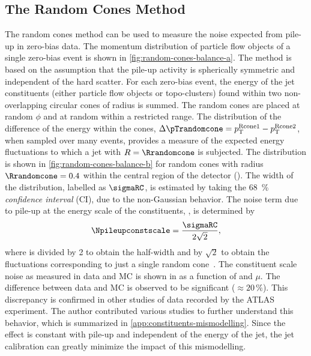 

\subsection{The Random Cones Method}
\label{subsec:random-cones-method}

The random cones method can be used to measure the noise expected from pile-up in zero-bias data. The momentum distribution of particle flow objects of a single zero-bias event is shown in \cref{fig:random-cones-balance-a}.
The method is based on the assumption that the pile-up activity is spherically symmetric and independent of the hard scatter.
For each zero-bias event, the energy of the jet constituents (either particle flow objects or topo-clusters) found within two non-overlapping circular cones of radius \Rrandomcone is summed.
The random cones are placed at random $\phi$ and at random \abseta within a restricted range.
The distribution of the difference of the energy within the cones, $\Delta \pTrandomcone = p_{\text{T}}^{\text{Rcone1}} - p_{\text{T}}^\text{Rcone2}$, when sampled over many events, provides a measure of the expected energy fluctuations to which a jet with $R = \Rrandomcone$ is subjected.
The distribution is shown in \cref{fig:random-cones-balance-b} for random cones with radius $\Rrandomcone = 0.4$ within the central region of the detector (). The width of the distribution, labelled as $\sigmaRC$, is estimated by taking the \SI{68}{\percent} \emph{confidence interval} (CI), due to the non-Gaussian behavior.
The noise term due to pile-up at the energy scale of the constituents, \Npileupconstscale, is determined by
\begin{equation}
    \Npileupconstscale = \frac{\sigmaRC}{2\sqrt{2}},
\end{equation}
where \sigmaRC is divided by 2 to obtain the half-width and by $\sqrt{2}$ to obtain the fluctuations corresponding to just a single random cone~\cite{JETM-2018-05}.
The constituent scale noise as measured in data and MC is shown in  as a function of \abseta and $\mu$.
The difference between data and MC is observed to be significant ($\approx 20\,\%$). This discrepancy is confirmed in other studies of data recorded by the ATLAS experiment. The author contributed various studies to further understand this behavior, which is summarized in \cref{app:constituents-mismodelling}. 
Since the effect is constant with pile-up and independent of the energy of the jet, the jet calibration can greatly minimize the impact of this mismodelling. 

